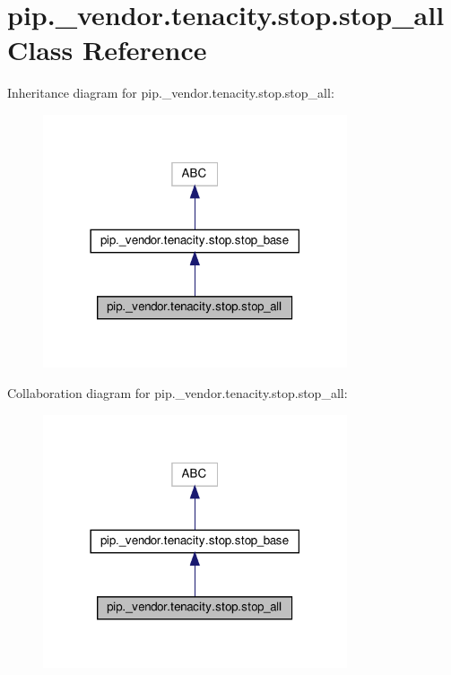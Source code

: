 \hypertarget{classpip_1_1__vendor_1_1tenacity_1_1stop_1_1stop__all}{}\section{pip.\+\_\+vendor.\+tenacity.\+stop.\+stop\+\_\+all Class Reference}
\label{classpip_1_1__vendor_1_1tenacity_1_1stop_1_1stop__all}


Inheritance diagram for pip.\+\_\+vendor.\+tenacity.\+stop.\+stop\+\_\+all\+:
\nopagebreak
\begin{figure}[H]
\begin{center}
\leavevmode
\includegraphics[width=254pt]{classpip_1_1__vendor_1_1tenacity_1_1stop_1_1stop__all__inherit__graph}
\end{center}
\end{figure}


Collaboration diagram for pip.\+\_\+vendor.\+tenacity.\+stop.\+stop\+\_\+all\+:
\nopagebreak
\begin{figure}[H]
\begin{center}
\leavevmode
\includegraphics[width=254pt]{classpip_1_1__vendor_1_1tenacity_1_1stop_1_1stop__all__coll__graph}
\end{center}
\end{figure}
